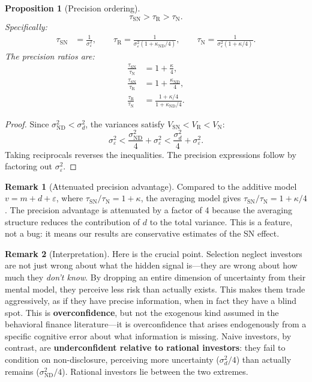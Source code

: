 \documentclass[12pt]{article}
\theoremstyle{plain}
\newtheorem{proposition}{Proposition}
\theoremstyle{definition}
\newtheorem{remark}{Remark}
\newcommand{\ND}{\mathrm{ND}}
\newcommand{\R}{\mathrm{R}}
\newcommand{\SN}{\mathrm{SN}}
\newcommand{\N}{\mathrm{N}}
\begin{document}
\begin{proposition}[Precision ordering]
\label{prop:precision}
\begin{equation}
\tau_\SN > \tau_\R > \tau_\N.
\end{equation}
Specifically:
\begin{align}
\tau_\SN &= \frac{1}{\sigma_\varepsilon^2}, \qquad
\tau_\R = \frac{1}{\sigma_\varepsilon^2(1 + \kappa_{\ND}/4)}, \qquad
\tau_\N = \frac{1}{\sigma_\varepsilon^2(1 + \kappa/4)}.
\end{align}
The precision ratios are:
\begin{align}
\frac{\tau_\SN}{\tau_\N} &= 1 + \frac{\kappa}{4}, \label{eq:sn_n_ratio}\\
\frac{\tau_\SN}{\tau_\R} &= 1 + \frac{\kappa_{\ND}}{4}, \label{eq:sn_r_ratio}\\
\frac{\tau_\R}{\tau_\N} &= \frac{1 + \kappa/4}{1 + \kappa_{\ND}/4}. \label{eq:r_n_ratio}
\end{align}
\end{proposition}

\begin{proof}
Since $\sigma_{\ND}^2 < \sigma_d^2$, the variances satisfy $V_\SN < V_\R < V_\N$:
\[
\sigma_\varepsilon^2 < \frac{\sigma_{\ND}^2}{4} + \sigma_\varepsilon^2 < \frac{\sigma_d^2}{4} + \sigma_\varepsilon^2.
\]
Taking reciprocals reverses the inequalities. The precision expressions follow by factoring out $\sigma_\varepsilon^2$.
\end{proof}

\begin{remark}[Attenuated precision advantage]
\label{rmk:attenuated}
Compared to the additive model $v = m + d + \varepsilon$, where $\tau_\SN/\tau_\N = 1 + \kappa$, the averaging model gives $\tau_\SN/\tau_\N = 1 + \kappa/4$. The precision advantage is attenuated by a factor of 4 because the averaging structure reduces the contribution of $d$ to the total variance. This is a feature, not a bug: it means our results are conservative estimates of the SN effect.
\end{remark}

\begin{remark}[Interpretation]
Here is the crucial point. Selection neglect investors are not just wrong about what the hidden signal is---they are wrong about how much they \emph{don't know}. By dropping an entire dimension of uncertainty from their mental model, they perceive less risk than actually exists. This makes them trade aggressively, as if they have precise information, when in fact they have a blind spot. This is \textbf{overconfidence}, but not the exogenous kind assumed in the behavioral finance literature---it is overconfidence that arises endogenously from a specific cognitive error about what information is missing. Naive investors, by contrast, are \textbf{underconfident relative to rational investors}: they fail to condition on non-disclosure, perceiving more uncertainty ($\sigma_d^2/4$) than actually remains ($\sigma_{\ND}^2/4$). Rational investors lie between the two extremes.
\end{remark}
\end{document}
